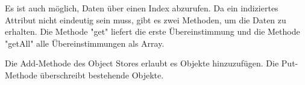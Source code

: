 
Es ist auch möglich, Daten über einen Index abzurufen. Da ein indiziertes 
Attribut nicht eindeutig sein muss, gibt es zwei Methoden, um die Daten zu erhalten. Die Methode "get" liefert die erste Übereinstimmung und die Methode "getAll" alle Über\-ein\-stimmungen als Array.


Die Add-Methode des Object Stores erlaubt es Objekte hinzuzufügen. Die Put-Methode überschreibt bestehende Objekte.
\cite{MDNIndexedDB}
\cite{MDNUsingIndexedDB}